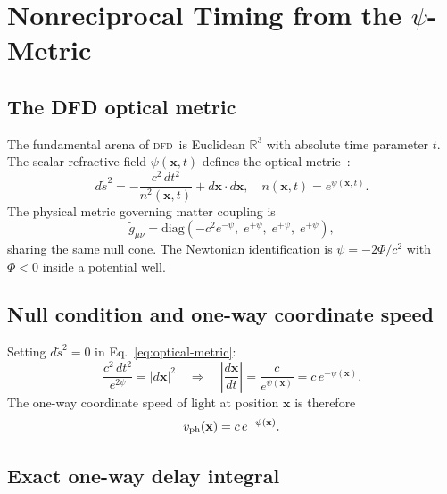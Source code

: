 \documentclass[aps,prd,twocolumn,superscriptaddress,nofootinbib,longbibliography]{revtex4-2}
\newcommand{\DFD}{\textsc{dfd}}
\begin{document}
\section{Nonreciprocal Timing from the $\psi$-Metric}\label{sec:nonrecip}

\subsection{The DFD optical metric}\label{sec:optical-metric-review}

The fundamental arena of \DFD\ is Euclidean $\mathbb{R}^3$ with absolute
time parameter $t$. The scalar refractive field $\psi(\mathbf{x},t)$
defines the optical metric~\cite{DFD-formalism}:
\begin{equation}\label{eq:optical-metric}
d\tilde{s}^2 = -\frac{c^2\,dt^2}{n^2(\mathbf{x},t)} + d\mathbf{x}\cdot d\mathbf{x},
\quad n(\mathbf{x},t) = e^{\psi(\mathbf{x},t)}.
\end{equation}
The physical metric governing matter coupling is
\begin{equation}\label{eq:physical-metric}
\tilde{g}_{\mu\nu} = \mathrm{diag}\!\left(-c^2 e^{-\psi},\;
e^{+\psi},\; e^{+\psi},\; e^{+\psi}\right),
\end{equation}
sharing the same null cone. The Newtonian identification is
$\psi = -2\Phi/c^2$ with $\Phi < 0$ inside a potential well.

\subsection{Null condition and one-way coordinate speed}\label{sec:null}

Setting $d\tilde{s}^2 = 0$ in Eq.~\eqref{eq:optical-metric}:
\begin{equation}\label{eq:null-condition}
\frac{c^2\,dt^2}{e^{2\psi}} = |d\mathbf{x}|^2
\quad\Longrightarrow\quad
\left|\frac{d\mathbf{x}}{dt}\right| = \frac{c}{e^{\psi(\mathbf{x})}}
= c\,e^{-\psi(\mathbf{x})}.
\end{equation}
The one-way coordinate speed of light at position $\mathbf{x}$ is therefore
\begin{equation}\label{eq:c-local}
v_{\rm ph}(\mathbf{x}) = c\,e^{-\psi(\mathbf{x})}.
\end{equation}

\subsection{Exact one-way delay integral}\label{sec:one-way-exact}
\end{document}
